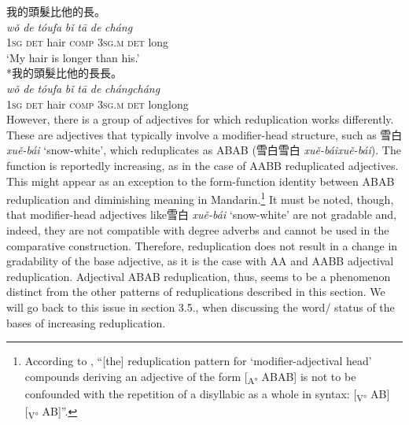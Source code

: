 \documentclass[output=paper]{langsci/langscibook}
\begin{document}
    \ea\label{ex:BascianoMelloni:16a}  我的頭髮比他的長。\\
    \gll  \emph{wǒ} \emph{de} \emph{tóufa} \emph{bǐ} \emph{tā} \emph{de} \emph{cháng}\\
    1\textsc{sg} \textsc{det} hair \textsc{comp} 3\textsc{sg.m} \textsc{det}
long\\
  \glt `My hair is longer than his.'\\

    \ex\label{ex:BascianoMelloni:16b}  *我的頭髮比他的長長。\\
    \gll  \emph{wǒ} \emph{de} \emph{tóufa} \emph{bǐ} \emph{tā} \emph{de} \emph{cháng}\tld{}\emph{cháng}\\
    1\textsc{sg} \textsc{det} hair \textsc{comp} 3\textsc{sg.m} \textsc{det}
long\tld{}long\\

\z\z
However, there is a group of adjectives for which reduplication works
differently. These are adjectives that typically involve a modifier-head
structure, such as 雪白 \emph{xuě-bái} `snow-white', which reduplicates
as ABAB (雪白雪白 \emph{xuě-bái\tld{}xuě-bái}). The function
is reportedly increasing, as in the case of AABB reduplicated
adjectives. This might appear as an exception to the form-function
identity between ABAB reduplication and diminishing meaning in
Mandarin.\footnote{According to %
\citet[137, fn. 15]{Paul2010a}%
%
, ``{[}the{]}
  reduplication pattern for `modifier-adjectival head' compounds
  deriving an adjective of the form {[}\textsubscript{A°} ABAB{]} is not
  to be confounded with the repetition of a disyllabic  as a whole
  in syntax: {[}\textsubscript{V°} AB{]} {[}\textsubscript{V°} AB{]}''.}
It must be noted, though, that modifier-head adjectives like雪白
\emph{xuě-bái} `snow-white' are not gradable and, indeed, they are not
compatible with degree adverbs and cannot be used in the comparative
construction. Therefore, reduplication does not result in a change in
gradability of the base adjective, as it is the case with AA and AABB
adjectival reduplication. Adjectival ABAB reduplication, thus, seems to
be a phenomenon distinct from the other patterns of reduplications
described in this section. We will go back to this issue in section
3.5., when discussing the word/ status of the bases of increasing
reduplication.
\end{document}
